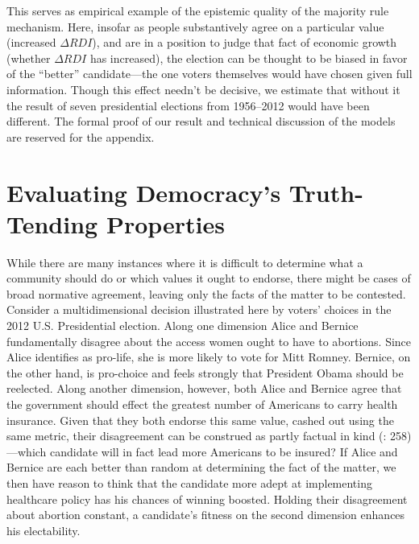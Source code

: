 \documentclass[11pt]{article}
\begin{document}
This serves as empirical example of the epistemic quality of the majority rule mechanism. Here, insofar as people substantively agree on a particular value (increased $\Delta RDI$), and are in a position to judge that fact of economic growth (whether $\Delta RDI$ has increased), the election can be thought to be biased in favor of the ``better'' candidate---the one voters themselves would have chosen given full information. %
Though this effect needn't be decisive, we estimate that without it the result of seven presidential elections from 1956--2012 would have been different. The formal proof of our result and technical discussion of the models are reserved for the appendix.


\section{Evaluating Democracy's Truth-Tending Properties}\label{sec:theory}


While there are many instances where it is difficult to determine what a community should do or which values it ought to endorse, there might be cases of broad normative agreement, leaving only the facts of the matter to be contested.
 Consider a multidimensional decision illustrated here by voters' choices in the 2012 U.S. Presidential election. Along one dimension Alice and Bernice fundamentally disagree about the access women ought to have to abortions. Since Alice identifies as pro-life, she is more likely to vote for Mitt Romney. Bernice, on the other hand, is pro-choice and feels strongly that President Obama should be reelected. Along another dimension, however, both Alice and Bernice agree that the government should effect the greatest number of Americans to carry health insurance. Given that they both endorse this same value, cashed out using the same metric, their disagreement can be construed as partly factual in kind (\citet{Page2007}: 258)---which candidate will in fact lead more Americans to be insured? If Alice and Bernice are each better than random at determining the fact of the matter, we then have reason to think that the candidate more adept at implementing healthcare policy has his chances of winning boosted. Holding their disagreement about abortion constant, a candidate's fitness on the second dimension enhances his electability.
\end{document}
